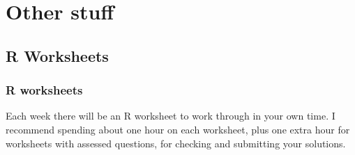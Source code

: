 \documentclass[
  a4paper,
]{book}
\theoremstyle{definition}
\theoremstyle{definition}
\theoremstyle{definition}
\theoremstyle{definition}
\theoremstyle{remark}
\begin{document}
\hypertarget{part-other-stuff}{%
\part*{Other stuff}\label{part-other-stuff}}

\hypertarget{R}{%
\chapter*{R Worksheets}\label{R}}

\hypertarget{r-work}{%
\section*{R worksheets}\label{r-work}}

Each week there will be an R worksheet to work through in your own time. I recommend spending about one hour on each worksheet, plus one extra hour for worksheets with assessed questions, for checking and submitting your solutions.
\end{document}
